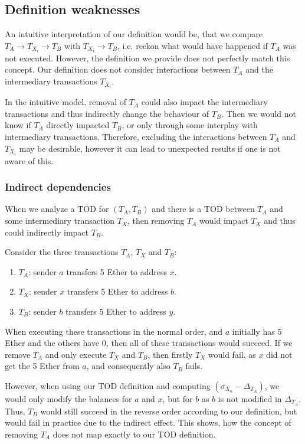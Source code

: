 \documentclass[draft,final]{vutinfth} %
\begin{document}
\subsection{Definition weaknesses}
\label{sec:weaknesses}

An intuitive interpretation of our definition would be, that we compare $T_A \rightarrow T_{X_i} \rightarrow T_B$ with $T_{X_i} \rightarrow T_B$, i.e. reckon what would have happened if $T_A$ was not executed. However, the definition we provide does not perfectly match this concept. Our definition does not consider interactions between $T_A$ and the intermediary transactions $T_{X_i}$.

In the intuitive model, removal of $T_A$ could also impact the intermediary transactions and thus indirectly change the behaviour of $T_B$. Then we would not know if $T_A$ directly impacted $T_B$, or only through some interplay with intermediary transactions. Therefore, excluding the interactions between $T_A$ and $T_{X_i}$ may be desirable, however it can lead to unexpected results if one is not aware of this.

\subsubsection{Indirect dependencies}

When we analyze a TOD for $(T_A, T_B)$ and there is a TOD between $T_A$ and some intermediary transaction $T_X$, then removing $T_A$ would impact $T_X$ and thus could indirectly impact $T_B$.

Consider the three transactions $T_A$, $T_X$ and $T_B$:

\begin{enumerate}
    \item $T_A$: sender $a$ transfers 5 Ether to address $x$.
    \item $T_X$: sender $x$ transfers 5 Ether to address $b$.
    \item $T_B$: sender $b$ transfers 5 Ether to address $y$.
\end{enumerate}

When executing these transactions in the normal order, and $a$ initially has 5 Ether and the others have 0, then all of these transactions would succeed. If we remove $T_A$ and only execute $T_X$ and $T_B$, then firstly $T_X$ would fail, as $x$ did not get the 5 Ether from $a$, and consequently also $T_B$ fails.

However, when using our TOD definition and computing $(\sigma_{X_n} - \Delta_{T_A})$, we would only modify the balances for $a$ and $x$, but for $b$ as $b$ is not modified in $\Delta_{T_A}$. Thus, $T_B$ would still succeed in the reverse order according to our definition, but would fail in practice due to the indirect effect. This shows, how the concept of removing $T_A$ does not map exactly to our TOD definition.
\end{document}

